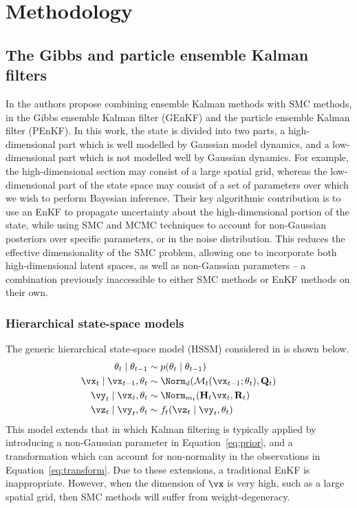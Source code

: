 \documentclass[12pt]{article}
\begin{document}
\section{Methodology}

\subsection{The Gibbs and particle ensemble Kalman filters}
In \cite{katzfuss2020} the authors propose combining ensemble Kalman methods
with SMC methods, in the Gibbs ensemble Kalman filter (GEnKF) and the particle
ensemble Kalman filter (PEnKF). In this work, the state is divided into two parts,
a high-dimensional part which is well modelled by Gaussian model dynamics,
and a low-dimensional part which is not modelled well by Gaussian dynamics.
For example, the high-dimensional section may consist of a large spatial grid,
whereas the low-dimensional part of the state space may consist of a set of
parameters over which we wish to perform Bayesian inference. Their key
algorithmic contribution is to use an EnKF to propagate
uncertainty about the high-dimensional portion of the state, while using SMC 
and MCMC techniques to account for non-Gaussian posteriors over specific
parameters, or in the noise distribution. This reduces the effective
dimensionality of the SMC problem, allowing one to incorporate both
high-dimensional latent spaces, as well as non-Gaussian parameters -- a
combination previously inaccessible to either SMC methods or EnKF methods on
their own.

\subsubsection{Hierarchical state-space models}
The generic hierarchical state-space model (HSSM) considered in \cite{katzfuss2020} is
shown below.
\begin{align}
    \theta_t \mid \theta_{t-1} &\sim p(\theta_t \mid \theta_{t-1}) \label{eq:prior}\\
    \vx_t \mid \vx_{t-1}, \theta_t &\sim \Norm_d(\mathcal M_t(\vx_{t-1}; \theta_t), \mathbf Q_t) \\
    \vy_t \mid \vx_t, \theta_t &\sim \Norm_{m_t}(\mathbf H_t \vx_t, \mathbf R_t) \\
    \vz_t \mid \vy_t, \theta_t &\sim f_t(\vz_t \mid \vy_t, \theta_t) \label{eq:transform}
\end{align}
This model extends that in which Kalman filtering is typically applied by
introducing a non-Gaussian parameter in Equation~\eqref{eq:prior}, and a transformation
which can account for non-normality in the observations in Equation~\eqref{eq:transform}.
Due to these extensions, a traditional EnKF is inappropriate.
However, when the dimension of $\vx$ is very high, such as a large spatial grid,
then SMC methods will suffer from weight-degeneracy.
\end{document}
